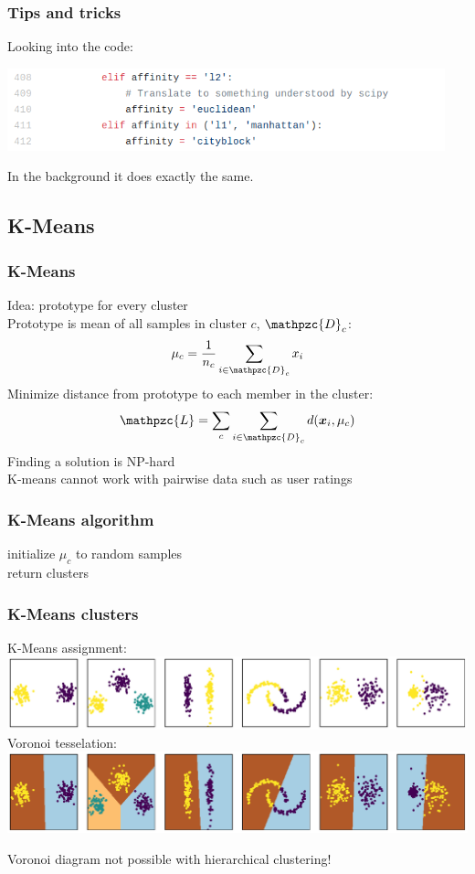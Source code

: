 \documentclass[Nike]{tuberlinbeamer}
\newcommand{\x}{\boldsymbol{x}}
\begin{document}
\begin{frame}
  \frametitle{Tips and tricks}
  Looking into the code:
  \begin{center}
    \centering\includegraphics[width=0.95\textwidth]{sklearn_code.png}
  \end{center}
  In the background it does exactly the same.
\end{frame}

\subsection{K-Means}
\begin{frame}
  \frametitle{K-Means}
  Idea: prototype for every cluster
  \\
  Prototype is mean of all samples in cluster $c$, $\mathpzc{D}_c$:
  \begin{equation*}
    \mu_c = \frac{1}{n_c} \sum_{i \in \mathpzc{D}_c} x_i
  \end{equation*}
  \pause
  Minimize distance from prototype to each member in the cluster:
  \begin{equation*}
    \mathpzc{L} = \sum_c \sum_{i \in \mathpzc{D}_c} d(\x_i, \mu_c)
  \end{equation*}
  \pause
  Finding a solution is NP-hard
  \\
  K-means cannot work with pairwise data such as user ratings
\end{frame}


\begin{frame}
  \frametitle{K-Means algorithm}
  initialize $\mu_c$ to random samples\\
  return clusters
\end{frame}


\begin{frame}
  \frametitle{K-Means clusters}
  \begin{center}
    K-Means assignment:
    \centering\includegraphics[width=1.0\textwidth]{kmeans_clusters.pdf}
    \pause
    Voronoi tesselation:
    \centering\includegraphics[width=1.0\textwidth]{kmeans_clusters_voronoi.pdf}
  \end{center}
  Voronoi diagram not possible with hierarchical clustering!
\end{frame}
\end{document}
